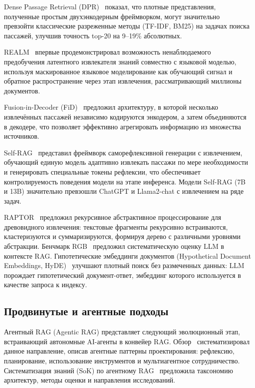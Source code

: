 Dense Passage Retrieval (DPR)~\cite{2004.04906} показал, что плотные представления, полученные простым двухэнкодерным фреймворком, могут значительно превзойти классические разреженные методы (TF-IDF, BM25) на задачах поиска пассажей, улучшив точность top-20 на 9--19\% абсолютных.

REALM~\cite{2002.08909} впервые продемонстрировал возможность ненаблюдаемого предобучения латентного извлекателя знаний совместно с языковой моделью, используя маскированное языковое моделирование как обучающий сигнал и обратное распространение через этап извлечения, рассматривающий миллионы документов.

Fusion-in-Decoder (FiD)~\cite{2007.01282} предложил архитектуру, в которой несколько извлечённых пассажей независимо кодируются энкодером, а затем объединяются в декодере, что позволяет эффективно агрегировать информацию из множества источников.

Self-RAG~\cite{2310.11511} представил фреймворк саморефлексивной генерации с извлечением, обучающий единую модель адаптивно извлекать пассажи по мере необходимости и генерировать специальные токены рефлексии, что обеспечивает контролируемость поведения модели на этапе инференса. Модели Self-RAG (7B и 13B) значительно превзошли ChatGPT и Llama2-chat с извлечением на ряде задач.

RAPTOR~\cite{2401.18059} предложил рекурсивное абстрактивное процессирование для древовидного извлечения: текстовые фрагменты рекурсивно встраиваются, кластеризуются и суммаризируются, формируя дерево с различными уровнями абстракции. Бенчмарк RGB~\cite{2309.01431} предложил систематическую оценку LLM в контексте RAG. Гипотетические эмбеддинги документов (Hypothetical Document Embeddings, HyDE)~\cite{2212.10496} улучшают плотный поиск без размеченных данных: LLM порождает гипотетический документ-ответ, эмбеддинг которого используется в качестве запроса к индексу.

\subsection{Продвинутые и агентные подходы}\label{subsec:advanced_rag}

Агентный RAG (Agentic RAG) представляет следующий эволюционный этап, встраивающий автономные AI-агенты в конвейер RAG. Обзор~\cite{2501.09136} систематизировал данное направление, описав агентные паттерны проектирования: рефлексию, планирование, использование инструментов и мультиагентное сотрудничество. Систематизация знаний (SoK) по агентному RAG~\cite{2603.07379} предложила таксономию архитектур, методы оценки и направления исследований.

